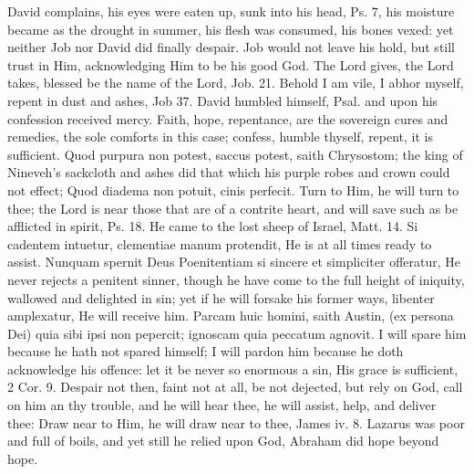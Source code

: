 {David complains, his eyes were eaten up, sunk into his head, Ps.  7,
his moisture became as the drought in summer, his flesh was consumed,
his bones vexed: yet neither Job nor David did finally despair. Job
would not leave his hold, but still trust in Him, acknowledging Him to
be his good God. The Lord gives, the Lord takes, blessed be the name of
the Lord, Job.  21. Behold I am vile, I abhor myself, repent in dust
and ashes, Job  37. David humbled himself, Psal.  and upon
his confession received mercy. Faith, hope, repentance, are the
sovereign cures and remedies, the sole comforts in this case; confess,
humble thyself, repent, it is sufficient. Quod purpura non potest,
saccus potest, saith Chrysostom; the king of Nineveh's sackcloth and
ashes did that which his purple robes and crown could not effect; Quod
diadema non potuit, cinis perfecit. Turn to Him, he will turn to thee;
the Lord is near those that are of a contrite heart, and will save such
as be afflicted in spirit, Ps.  18. He came to the lost sheep of
Israel, Matt.  14. Si cadentem intuetur, clementiae manum protendit,
He is at all times ready to assist. Nunquam spernit Deus Poenitentiam
si sincere et simpliciter offeratur, He never rejects a penitent
sinner, though he have come to the full height of iniquity, wallowed
and delighted in sin; yet if he will forsake his former ways, libenter
amplexatur, He will receive him. Parcam huic homini, saith
Austin, (ex persona Dei) quia sibi ipsi non pepercit; ignoscam
quia peccatum agnovit. I will spare him because he hath not spared
himself; I will pardon him because he doth acknowledge his offence: let
it be never so enormous a sin, His grace is sufficient, 2 Cor.  9.
Despair not then, faint not at all, be not dejected, but rely on God,
call on him an thy trouble, and he will hear thee, he will assist,
help, and deliver thee: Draw near to Him, he will draw near to thee,
James iv. 8. Lazarus was poor and full of boils, and yet still he
relied upon God, Abraham did hope beyond hope.

}
